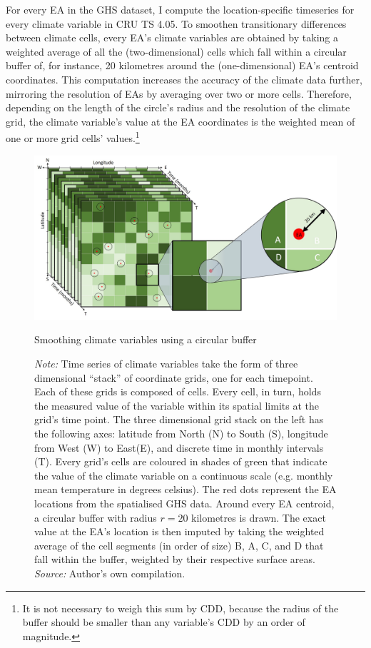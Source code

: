 \documentclass[a4paper,12pt]{article}
\theoremstyle{plain}
\theoremstyle{definition}
\theoremstyle{definition}
\theoremstyle{definition}
\theoremstyle{definition}
\begin{document}
For every EA in the GHS dataset, I compute the location-specific timeseries for every climate variable in CRU TS 4.05. To smoothen transitionary differences between climate cells, every EA's climate variables are obtained by taking a weighted average of all the (two-dimensional) cells which fall within a circular buffer of, for instance, 20 kilometres around the (one-dimensional) EA's centroid coordinates. This computation increases the accuracy of the climate data further, mirroring the resolution of EAs by averaging over two or more cells. Therefore, depending on the length of the circle's radius and the resolution of the climate grid, the climate variable's value at the EA coordinates is the weighted mean of one or more grid cells' values.\footnote{It is not necessary to weigh this sum by CDD, because the radius of the buffer should be smaller than any variable's CDD by an order of magnitude.} 

\begin{figure}
    \centering
    \includegraphics[scale=0.33]{../outputs/buffer.JPG}
    \caption{Smoothing climate variables using a circular buffer}
    \caption*{\footnotesize{\textit{Note:} Time series of climate variables take the form of three dimensional ``stack'' of coordinate grids, one for each timepoint. Each of these grids is composed of cells. Every cell, in turn, holds the measured value of the variable within its spatial limits at the grid's time point. The three dimensional grid stack on the left has the following axes: latitude from North (N) to South (S), longitude from West (W) to East(E), and discrete time in monthly intervals (T). Every grid's cells are coloured in shades of green that indicate the value of the climate variable on a continuous scale (e.g. monthly mean temperature in degrees celsius). The red dots represent the EA locations from the spatialised GHS data. Around every EA centroid, a circular buffer with radius $r=20$ kilometres is drawn. The exact value at the EA's location is then imputed by taking the weighted average of the cell segments (in order of size) B, A, C, and D that fall within the buffer, weighted by their respective surface areas. \\ \textit{Source:} Author's own compilation.}}
    \label{fig:buffer}
\end{figure}
\end{document}

